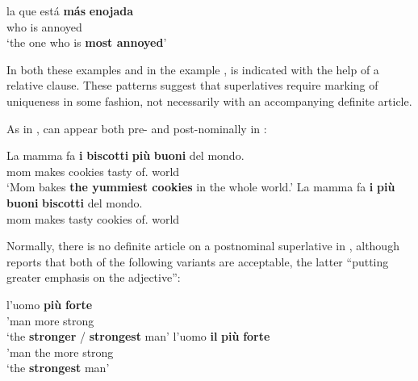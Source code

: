 \documentclass[output=paper
,modfonts
,nonflat]{langsci/langscibook}
\begin{document}
\ea \label{ex:coppockstrand:57}
\gll la que est\'a \textbf{m\'as} \textbf{enojada}\\
 who is \cmpr{} annoyed\\ 
\glt `the one who is \textbf{most annoyed}'
\z

In both these examples and in the  example ,  is indicated with the help of a relative clause. These patterns suggest that superlatives require marking of uniqueness in some fashion, not necessarily with an accompanying definite article.

As in ,  can appear both pre- and post-nominally in :
\ea \label{ex:coppockstrand:58}
\begin{xlist}
\ex 
\gll La mamma fa \textbf{i} \textbf{biscotti} \textbf{più} \textbf{buoni} del mondo. \\
 mom makes  cookies \cmpr{} tasty of. world\\  
\glt `Mom bakes \textbf{the yummiest cookies} in the whole world.'
\ex
\gll La mamma fa \textbf{i} \textbf{più} \textbf{buoni} \textbf{biscotti} del mondo. \\
 mom makes  \cmpr{} tasty cookies of. world\\ 
\end{xlist}
\z

Normally, there is no definite article on a postnominal superlative in , although \citet{Plank2003} reports that both of the following variants are acceptable, the latter ``putting greater emphasis on the adjective'':

\ea \label{ex:coppockstrand:59}
\begin{xlist}
\ex
\gll l'uomo \textbf{pi\`u} \textbf{forte}\\
'man more strong\\ 
\glt `the \textbf{stronger} / \textbf{strongest} man'
\ex
\gll l'uomo \textbf{il} \textbf{pi\`u} \textbf{forte}\\
'man the more strong\\
\glt`the \textbf{strongest} man'
\end{xlist}
\z
\end{document}

